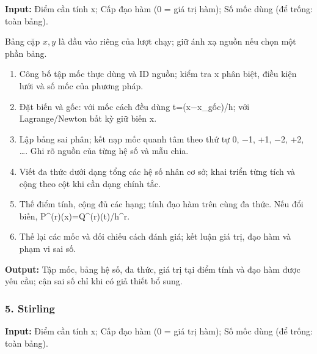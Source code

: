 \textbf{Input:} Điểm cần tính x;\allowbreak{} Cấp đạo hàm (\allowbreak{}0 =\allowbreak{} giá trị hàm);\allowbreak{} Số mốc dùng (\allowbreak{}để trống: toàn bảng).

Bảng cặp $x,y$ là đầu vào riêng của lượt chạy; giữ ánh xạ nguồn nếu chọn một phần bảng.

\begin{enumerate}

\item Công bố tập mốc thực dùng và ID nguồn;\allowbreak{} kiểm tra x phân biệt,\allowbreak{} điều kiện lưới và số mốc của phương pháp.

\item Đặt biến và gốc: với mốc cách đều dùng t=\allowbreak{}(\allowbreak{}x\ensuremath{-}x\_gốc)/\allowbreak{}h;\allowbreak{} với Lagrange/\allowbreak{}Newton bất kỳ giữ biến x.

\item Lập bảng sai phân;\allowbreak{} kết nạp mốc quanh tâm theo thứ tự 0,\allowbreak{} \ensuremath{-}1,\allowbreak{} +\allowbreak{}1,\allowbreak{} \ensuremath{-}2,\allowbreak{} +\allowbreak{}2,\allowbreak{} …. Ghi rõ nguồn của từng hệ số và mẫu chia.

\item Viết đa thức dưới dạng tổng các hệ số nhân cơ sở;\allowbreak{} khai triển từng tích và cộng theo cột khi cần dạng chính tắc.

\item Thế điểm tính,\allowbreak{} cộng đủ các hạng;\allowbreak{} tính đạo hàm trên cùng đa thức. Nếu đổi biến,\allowbreak{} P\textasciicircum{}(\allowbreak{}r)(\allowbreak{}x)=\allowbreak{}Q\textasciicircum{}(\allowbreak{}r)(\allowbreak{}t)/\allowbreak{}h\textasciicircum{}r.

\item Thế lại các mốc và đối chiếu cách đánh giá;\allowbreak{} kết luận giá trị,\allowbreak{} đạo hàm và phạm vi sai số.

\end{enumerate}

\textbf{Output:} Tập mốc,\allowbreak{} bảng hệ số,\allowbreak{} đa thức,\allowbreak{} giá trị tại điểm tính và đạo hàm được yêu cầu;\allowbreak{} cận sai số chỉ khi có giả thiết bổ sung.

\examplebreak\subsubsection*{5. Stirling}

\textbf{Input:} Điểm cần tính x;\allowbreak{} Cấp đạo hàm (\allowbreak{}0 =\allowbreak{} giá trị hàm);\allowbreak{} Số mốc dùng (\allowbreak{}để trống: toàn bảng).

